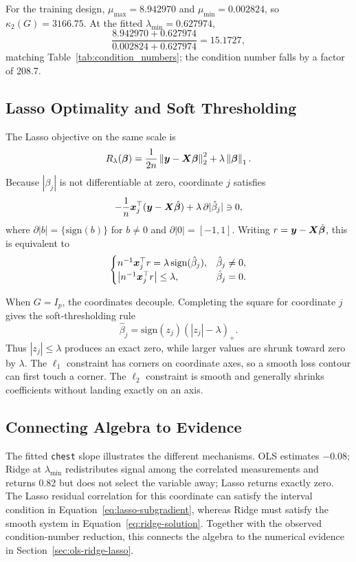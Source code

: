 For the training design, $\mu_{\max}=8.942970$ and
$\mu_{\min}=0.002824$, so $\kappa_2(G)=3166.75$.  At the fitted
$\lambda_{\min}=0.627974$,
\[
 \frac{8.942970+0.627974}{0.002824+0.627974}=15.1727,
\]
matching Table~\ref{tab:condition_numbers}; the condition number falls by a
factor of 208.7.

\subsection{Lasso Optimality and Soft Thresholding}
\label{sec:lasso-math}

The Lasso objective on the same scale is
\begin{equation}
 R_\lambda(\bm{\beta})=
 \frac{1}{2n}\left\lVert \bm{y}-\bm{X}\bm{\beta} \right\rVert_2^2+\lambda\left\lVert \bm{\beta} \right\rVert_1.
\label{eq:lasso-obj}
\end{equation}
Because $|\beta_j|$ is not differentiable at zero, coordinate $j$ satisfies
\begin{equation}
 -\frac{1}{n}\bm{x}_j^\top(\bm{y}-\bm{X}\hat{\bm{\beta}})
 +\lambda\,\partial|\hat\beta_j|\ni0,
\label{eq:lasso-subgradient}
\end{equation}
where $\partial|b|=\{\mathrm{sign}(b)\}$ for $b\ne0$ and
$\partial|0|=[-1,1]$.  Writing $r=\bm{y}-\bm{X}\hat{\bm{\beta}}$, this is equivalent to
\[
\begin{cases}
 n^{-1}\bm{x}_j^\top r=\lambda\,\mathrm{sign}(\hat\beta_j),
     & \hat\beta_j\ne0,\\
 \left|n^{-1}\bm{x}_j^\top r\right|\leq\lambda,
     & \hat\beta_j=0.
\end{cases}
\]

When $G=I_p$, the coordinates decouple.  Completing the square for coordinate
$j$ gives the soft-thresholding rule
\begin{equation}
 \boxed{\hat\beta_j
 =\mathrm{sign}(z_j)(|z_j|-\lambda)_+}.
\label{eq:soft-threshold}
\end{equation}
Thus $|z_j|\leq\lambda$ produces an exact zero, while larger values are shrunk
toward zero by $\lambda$.  The $\ell_1$ constraint has corners on coordinate
axes, so a smooth loss contour can first touch a corner.  The $\ell_2$
constraint is smooth and generally shrinks coefficients without landing
exactly on an axis.

\subsection{Connecting Algebra to Evidence}
\label{sec:algebra-evidence}

The fitted \texttt{chest} slope illustrates the different mechanisms.  OLS
estimates $-0.08$; Ridge at $\lambda_{\min}$ redistributes signal among the
correlated measurements and returns 0.82 but does not select the variable
away; Lasso returns exactly zero.  The Lasso residual correlation for this
coordinate can satisfy the interval condition in
Equation~\ref{eq:lasso-subgradient}, whereas Ridge must satisfy the smooth
system in Equation~\ref{eq:ridge-solution}.  Together with the observed
condition-number reduction, this connects the algebra to the numerical
evidence in Section~\ref{sec:ols-ridge-lasso}.
